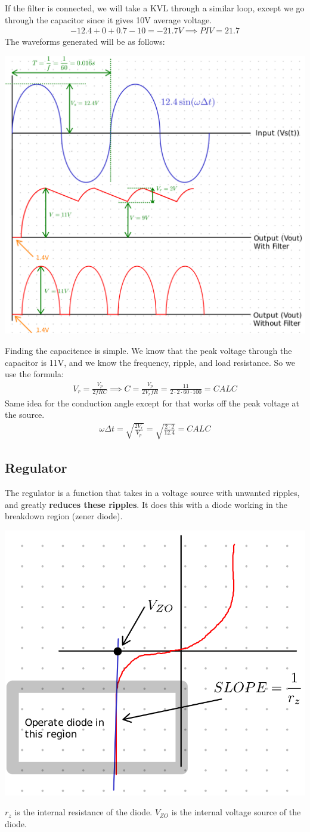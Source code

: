 \documentclass[12pt,letterpaper]{article} \usepackage{amsmath} \usepackage{graphicx} \usepackage[margin=1in]{geometry} \usepackage{longtable}  \usepackage{amssymb}
\begin{document}
\begin{mdframed}[]
		If the filter is connected, we will take a KVL through a similar loop, except we go through the capacitor since it gives 10V average voltage. 
		\begin{align*}
			-12.4+0+0.7-10=-21.7V \implies PIV = 21.7
		\end{align*}
		The waveforms generated will be as follows:
		\begin{center}
			\includegraphics[width=0.7\linewidth]{filter-ex2}
		\end{center}
		Finding the capacitence is simple. We know that the peak voltage through the capacitor is 11V, and we know the frequency, ripple, and load resistance. So we use the formula:
		\begin{align*}
			V_r = \frac{V_p}{2fRC}\implies C = \frac{V_p}{2V_rfR} = \frac{11}{2\cdot 2\cdot 60\cdot 100} = CALC
		\end{align*}
		Same idea for the conduction angle except for that works off the peak voltage at the source. 
		\begin{align*}
			\omega\Delta t = \sqrt{\frac{2V_r}{V_p}} = \sqrt{\frac{2\cdot 2}{12.4}} = CALC
		\end{align*}
		
	\end{mdframed}
	
	\subsection{Regulator}
	The regulator is a function that takes in a voltage source with unwanted ripples, and greatly \textbf{reduces these ripples}. It does this with a diode working in the breakdown region (zener diode).
	\begin{center}
		\includegraphics[width=0.4\linewidth]{regulator}
	\end{center}
	$r_z$ is the internal resistance of the diode. $V_{ZO}$ is the internal voltage source of the diode. 
	
\end{document}
